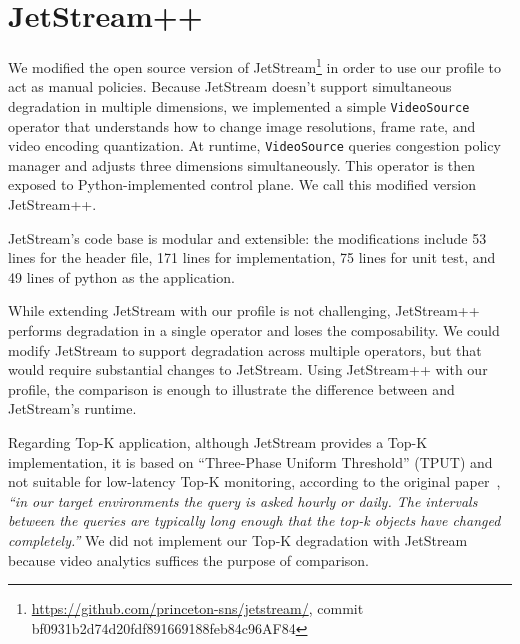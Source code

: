 \section{JetStream++}
\label{appendix:jetstream++}

We modified the open source version of
JetStream\footnote{\url{https://github.com/princeton-sns/jetstream/}, commit
  bf0931b2d74d20fdf891669188feb84c96AF84} in order to use our profile to act as
manual policies. Because JetStream doesn't support simultaneous degradation in
multiple dimensions, we implemented a simple \texttt{VideoSource} operator that
understands how to change image resolutions, frame rate, and video encoding
quantization. At runtime, \texttt{VideoSource} queries congestion policy manager
and adjusts three dimensions simultaneously. This operator is then exposed to
Python-implemented control plane. We call this modified version JetStream++.

JetStream's code base is modular and extensible: the modifications include 53
lines for the header file, 171 lines for implementation, 75 lines for unit test,
and 49 lines of python as the application.

While extending JetStream with our profile is not challenging, JetStream++
performs degradation in a single operator and loses the composability. We could
modify JetStream to support degradation across multiple operators, but that
would require substantial changes to JetStream. Using JetStream++ with our
profile, the comparison is enough to illustrate the difference between
\sysname{} and JetStream's runtime.

Regarding Top-K application, although JetStream provides a Top-K implementation,
it is based on ``Three-Phase Uniform Threshold'' (TPUT) and not suitable for
low-latency Top-K monitoring, according to the original
paper~\cite{cao2004efficient}, \textit{``in our target environments the query is
  asked hourly or daily. The intervals between the queries are typically long
  enough that the top-k objects have changed completely.''} We did not implement
our Top-K degradation with JetStream because video analytics suffices the
purpose of comparison.


